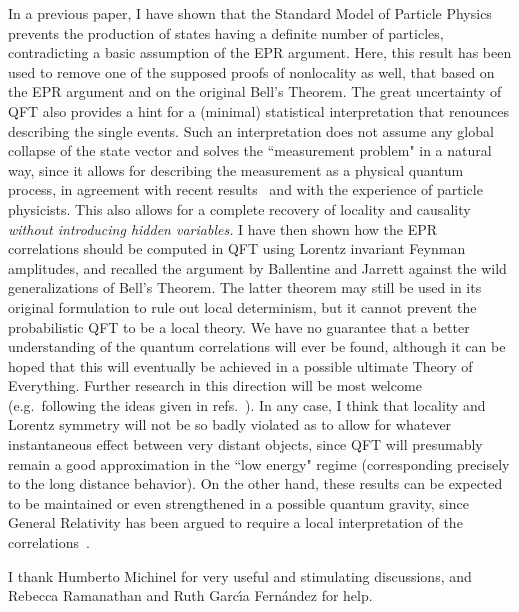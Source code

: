 \documentclass[published]{JHEP3}
\begin{document}
In a previous paper, I have shown that the Standard Model of Particle
Physics prevents the production of states having a definite number of
particles, contradicting a basic assumption of the EPR argument. Here,
this result has been used to remove one of the supposed proofs of
nonlocality as well, that based on the EPR argument and on the
original Bell's Theorem.  The great uncertainty of QFT also provides a
hint for a (minimal) statistical interpretation that renounces
describing the single events. Such an interpretation does not assume
any global collapse of the state vector and solves the ``measurement
problem" in a natural way, since it allows for describing the
measurement as a physical quantum process, in agreement with recent
results~\cite{Zeno} and with the experience of particle
physicists. This also allows for a complete recovery of locality and
causality {\it without introducing hidden variables.} I have then
shown how the EPR correlations should be computed in QFT using Lorentz
invariant Feynman amplitudes, and recalled the argument by Ballentine
and Jarrett against the wild generalizations of Bell's Theorem. The
latter theorem may still be used in its original formulation to rule
out local determinism, but it cannot prevent the probabilistic QFT to
be a local theory. We have no guarantee that a better understanding of
the quantum correlations will ever be found, although it can be hoped
that this will eventually be achieved in a possible ultimate Theory of
Everything. Further research in this direction will be most welcome
(e.g.\ following the ideas given in refs.~\cite{Porto,Czachor}). In
any case, I think that locality and Lorentz symmetry will not be so
badly violated as to allow for whatever instantaneous effect between
very distant objects, since QFT will presumably remain a good
approximation in the ``low energy" regime (corresponding precisely to
the long distance behavior). On the other hand, these results can be
expected to be maintained or even strengthened in a possible quantum
gravity, since General Relativity has been argued to require a local
interpretation of the correlations~\cite{Mensky}.

\acknowledgments 

I thank Humberto Michinel for very useful and stimulating discussions,
and Rebecca Ramanathan and Ruth Garc\'\i a Fern\'andez for help.
\end{document}

